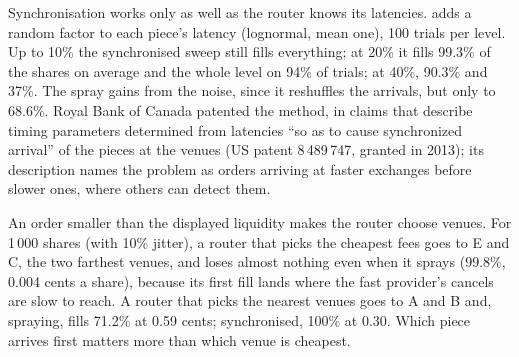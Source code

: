 \label{lst:mx:smart-order-routing:fader}

Synchronisation works only as well as the router knows its latencies.  adds a random factor to each piece's
latency (lognormal, mean one), 100 trials per level. Up to 10\% the synchronised sweep still fills everything; at 20\% it fills 99.3\% of the shares on
average and the whole level on 94\% of trials; at 40\%, 90.3\% and 37\%. The spray gains from the noise, since it reshuffles the arrivals, but only to
68.6\%. Royal Bank of Canada patented the method, in claims that describe timing parameters determined from latencies ``so as to cause synchronized
arrival'' of the pieces at the venues (US patent 8\,489\,747, granted in 2013); its description names the problem as orders arriving at faster
exchanges before slower ones, where others can detect them.

\begin{omfigure}

\label{fig:mx:smart-order-routing:jitter}
\end{omfigure}

An order smaller than the displayed liquidity makes the router choose venues. For 1\,000 shares (with 10\% jitter), a router that picks the cheapest
fees goes to E and C, the two farthest venues, and loses almost nothing even when it sprays (99.8\%, 0.004 cents a share), because its first fill lands
where the fast provider's cancels are slow to reach. A router that picks the nearest venues goes to A and B and, spraying, fills 71.2\% at 0.59 cents;
synchronised, 100\% at 0.30. Which piece arrives first matters more than which venue is cheapest.


